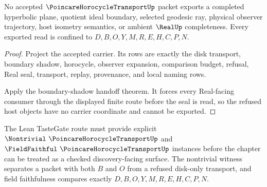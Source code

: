 \begin{theorem}
\label{thm:poincare-horocycle-transport-nonescape}
No accepted $\PoincareHorocycleTransportUp$ packet exports a completed hyperbolic plane, quotient ideal boundary, selected geodesic ray, physical observer trajectory, host isometry semantics, or ambient $\RealUp$ completeness. Every exported read is confined to $D,B,O,Y,M,R,E,H,C,P,N$.
\end{theorem}
\begin{proof}
Project the accepted carrier. Its rows are exactly the disk transport, boundary shadow, horocycle, observer expansion, comparison budget, refusal, Real seal, transport, replay, provenance, and local naming rows.

Apply the boundary-shadow handoff theorem. It forces every Real-facing consumer through the displayed finite route before the seal is read, so the refused host objects have no carrier coordinate and cannot be exported.
\end{proof}



The Lean TasteGate route must provide explicit $\Nontrivial\ \PoincareHorocycleTransportUp$ and $\FieldFaithful\ \PoincareHorocycleTransportUp$ instances before the chapter can be treated as a checked discovery-facing surface. The nontrivial witness separates a packet with both $B$ and $O$ from a refused disk-only transport, and field faithfulness compares exactly $D,B,O,Y,M,R,E,H,C,P,N$.



